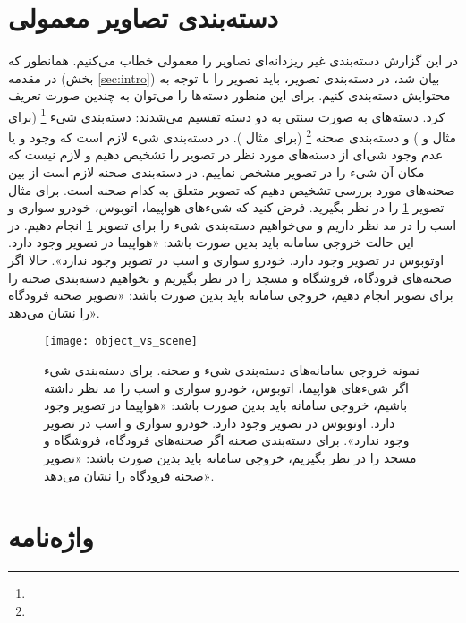 \documentclass[11pt]{article}
\begin{document}
\section{دسته‌بندی تصاویر معمولی}\label{sec:img_class}
در این گزارش دسته‌بندی غیر ریزدانه‌ای تصاویر را معمولی خطاب می‌کنیم. همانطور که در مقدمه (بخش
\ref{sec:intro})
بیان شد، در دسته‌بندی تصویر، باید تصویر را با توجه به محتوایش دسته‌بندی کنیم. برای این منظور دسته‌ها را می‌توان به چندین صورت تعریف کرد. دسته‌های به صورت سنتی به دو دسته تقسیم می‌شدند: دسته‌بندی شیء
\footnote{}
(برای مثال
 \cite{caltech101, caltech256}
و
 \cite{pascalvoc})
و دسته‌بندی صحنه
\footnote{}
(برای مثال
 \cite{mit67scene}).
در دسته‌بندی شیء لازم است که وجود و یا عدم وجود شی‌ای از دسته‌های مورد نظر در تصویر را تشخیص دهیم و لازم نیست که مکان آن شی‌ء را در تصویر مشخص نماییم. در دسته‌بندی صحنه لازم است از بین صحنه‌های مورد بررسی تشخیص دهیم که تصویر متعلق به کدام صحنه است. برای مثال تصویر
\ref{fig:img_class:object_vs_scene}
را در نظر بگیرید. فرض کنید که شی‌ء‌های هواپیما، اتوبوس، خودرو سواری و اسب را در مد نظر داریم و می‌خواهیم دسته‌بندی شی‌ء را برای تصویر
\ref{fig:img_class:object_vs_scene}
انجام دهیم. در این حالت خروجی سامانه باید بدین صورت باشد: «هواپیما در تصویر وجود دارد. اوتوبوس در تصویر وجود دارد. خودرو سواری و اسب در تصویر وجود ندارد». حالا اگر صحنه‌های فرودگاه، فروشگاه و مسجد را در نظر بگیریم و بخواهیم دسته‌بندی صحنه را برای تصویر انجام دهیم، خروجی سامانه باید بدین صورت باشد: «تصویر صحنه فرودگاه را نشان می‌دهد».
\begin{figure}[t!]
	\centering
	\texttt{[image: object\_vs\_scene]}
	\caption{نمونه خروجی سامانه‌های دسته‌بندی شی‌ء و صحنه. برای دسته‌بندی شی‌ء اگر شی‌ءهای هواپیما، اتوبوس، خودرو سواری و اسب را مد نظر داشته باشیم، خروجی سامانه باید بدین صورت باشد: «هواپیما در تصویر وجود دارد. اوتوبوس در تصویر وجود دارد. خودرو سواری و اسب در تصویر وجود ندارد».
برای دسته‌بندی صحنه اگر صحنه‌های فرودگاه، فروشگاه و مسجد را در نظر بگیریم، خروجی سامانه باید بدین صورت باشد: «تصویر صحنه فرودگاه را نشان می‌دهد».}
	\label{fig:img_class:object_vs_scene}
\end{figure}


\linespread{1}
\small
\setlength{\parskip}{0pt}
\setlength{\parsep}{0pt}

\renewcommand{\bibname}{مراجع}
\begin{latin}

%

\end{latin}



\section*{واژه‌نامه}
\begin{multicols}{3}
\theendnotes 
\end{multicols}
\end{document}
